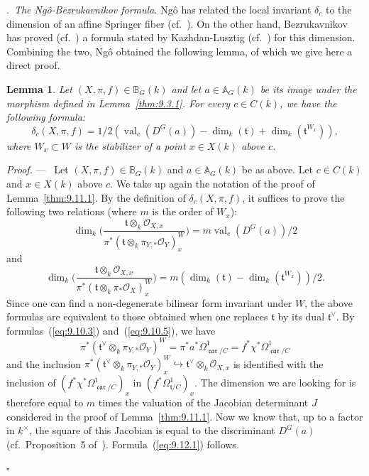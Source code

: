 \documentclass[12pt,a4paper,oneside,english,leqno]{smfart}
\makeatletter
\numberwithin{equation}{subsection}
\newcounter{theo}
\numberwithin{theo}{subsection}
\newenvironment{paragr}[1][]{\medskip\refstepcounter{subsection}%
  \par\noindent\hspace*{\parindent}\thesubsection.\ \emph{#1}%
  \@ifundefined{@empty}{}{}\ignorespaces}{\medskip}
\theoremstyle{plain}
\newtheorem{lemma}[theo]{Lemma}
\theoremstyle{definition}
\theoremstyle{remark}
\newenvironment{preuve}[1][]{\medskip\noindent\textit{Proof.} #1 ---\ }%
  {\hfill\ensuremath{\square}\medskip}
\DeclareMathOperator{\val}{val}
\DeclareMathOperator{\car}{\mathfrak{car}}
\newcommand{\AAA}{\mathbb{A}}
\newcommand{\BBB}{\mathbb{B}}
\newcommand{\oc}{\mathcal{O}}
\newcommand{\tgo}{\mathfrak{t}}
\makeatother
\begin{document}
\begin{paragr}[The Ng\^o-Bezrukavnikov formula.]\label{S:9.12}
Ng\^o has related the local invariant $\delta_c$ to the dimension of an affine Springer fiber (cf.\ \cite[Prop.~3.7.5 and Cor.~3.8.3]{Ngo-lemme}). On the other hand, Bezrukavnikov has proved (cf.\ \cite{Bezrukavnikov}) a formula stated by Kazhdan-Lusztig (cf.\ \cite{Kazhdan-Lusztig}) for this dimension. Combining the two, Ng\^o obtained the following lemma, of which we give here a direct proof.

\begin{lemma}\label{thm:9.12.1}
Let $(X,\pi,f)\in\BBB_G(k)$ and let $a\in\AAA_G(k)$ be its image under the morphism defined in Lemma~\ref{thm:9.3.1}. For every $c\in C(k)$, we have the following formula:
$$\delta_c(X,\pi,f)=1/2(\val_c(D^G(a))-\dim_k(\tgo)+\dim_k(\tgo^{W_x})),$$
where $W_x\subset W$ is the stabilizer of a point $x\in X(k)$ above $c$.
\end{lemma}

\begin{preuve}
Let $(X,\pi,f)\in\BBB_G(k)$ and $a\in\AAA_G(k)$ be as above. Let $c\in C(k)$ and $x\in X(k)$ above $c$. We take up again the notation of the proof of Lemma~\ref{thm:9.11.1}. By the definition of $\delta_c(X,\pi,f)$, it suffices to prove the following two relations (where $m$ is the order of $W_x$):
\begin{equation}\label{eq:9.12.1}
\dim_k\Big(\frac{\tgo\otimes_k\oc_{X,x}}{\pi^*(\tgo\otimes_k\pi_{Y,*}\oc_Y)^W_x}\Big)=m\val_c(D^G(a))/2
\end{equation}
and
\begin{equation}\label{eq:9.12.2}
\dim_k\Big(\frac{\tgo\otimes_k\oc_{X,x}}{\pi^*(\tgo\otimes_k\pi_*\oc_X)^W_x}\Big)=m(\dim_k(\tgo)-\dim_k(\tgo^{W_x}))/2.
\end{equation}
Since one can find a non-degenerate bilinear form invariant under $W$, the above formulas are equivalent to those obtained when one replaces $\tgo$ by its dual $\tgo^\vee$. By formulas~(\ref{eq:9.10.3}) and~(\ref{eq:9.10.5}), we have
$$\pi^*(\tgo^\vee\otimes_k\pi_{Y,*}\oc_Y)^W=\pi^*a^*\Omega^1_{\car/C}=f^*\chi^*\Omega^1_{\car/C}$$
and the inclusion $\pi^*(\tgo^\vee\otimes_k\pi_{Y,*}\oc_Y)^W_x\hookrightarrow\tgo^\vee\otimes_k\oc_{X,x}$ is identified with the inclusion of $(f^*\chi^*\Omega^1_{\car/C})_x$ in $(f^*\Omega^1_{\tgo/C})_x$. The dimension we are looking for is therefore equal to $m$ times the valuation of the Jacobian determinant $J$ considered in the proof of Lemma~\ref{thm:9.11.1}. Now we know that, up to a factor in $k^\times$, the square of this Jacobian is equal to the discriminant $D^G(a)$ (cf.\ Proposition~5 of~\cite{Bourbaki}). Formula~(\ref{eq:9.12.1}) follows.


\end{preuve}
\end{paragr}
\end{document}
